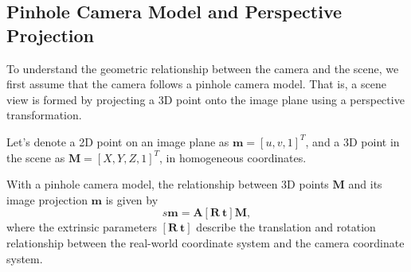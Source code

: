 \subsection{Pinhole Camera Model and Perspective Projection}
To understand the geometric relationship between the camera and the scene, we first assume that 
the camera follows a pinhole camera model. That is, a scene view is formed by projecting a 3D 
point onto the image plane using a perspective transformation. 

Let's denote a 2D point on an image plane as $\mathbf{m}=[u, v, 1]^{T}$, and a 3D point in the 
scene as $\mathbf{M}=[X, Y, Z, 1]^{T}$, in homogeneous coordinates.

With a pinhole camera model, the relationship between 3D points $\mathbf{M}$ and its image 
projection $\mathbf{m}$ is given by\begin{equation}s \mathbf{m} = \mathbf{A} [ \mathbf{R} ~ 
\mathbf{t} ] \mathbf{M}, \label{pinhole_model}\end{equation}where the extrinsic parameters $
[\mathbf{R} ~ \mathbf{t}]$ describe the translation and rotation relationship between the real-world 
coordinate system and the camera coordinate system. 

